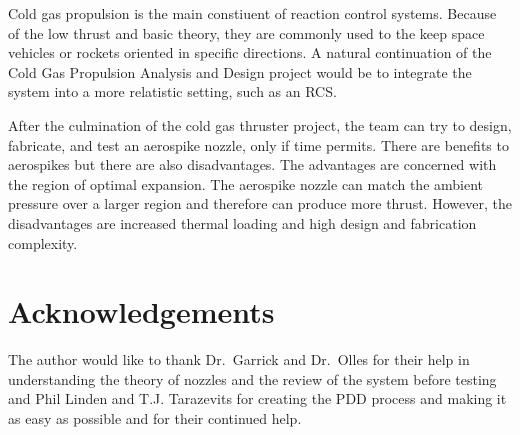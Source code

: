 \documentclass[conference]{IEEEtran} %
\begin{document}
Cold gas propulsion is the main constiuent of reaction control systems. Because of the low thrust and basic theory, they are commonly used to the keep space vehicles or rockets oriented
in specific directions. A natural continuation of the Cold Gas Propulsion Analysis and Design project would be to integrate the system into a more relatistic setting, such as an RCS\@.

After the culmination of the cold gas thruster project, the team can try to design, fabricate, and test an aerospike nozzle, only if time permits.
There are benefits to aerospikes but there are also disadvantages. The advantages are concerned with the region of optimal expansion. The aerospike nozzle can match the
ambient pressure over a larger region and therefore can produce more thrust. However, the disadvantages are increased thermal loading and high design and fabrication complexity\cite{SPAD}.

\section*{Acknowledgements}
The author would like to thank Dr.\ Garrick and Dr.\ Olles for their help in understanding the theory of nozzles and the review of the system before testing and
Phil Linden and T.J. Tarazevits for creating the PDD process and making it as easy as possible and for their continued help.




\onecolumn
\appendices{}
\end{document}
